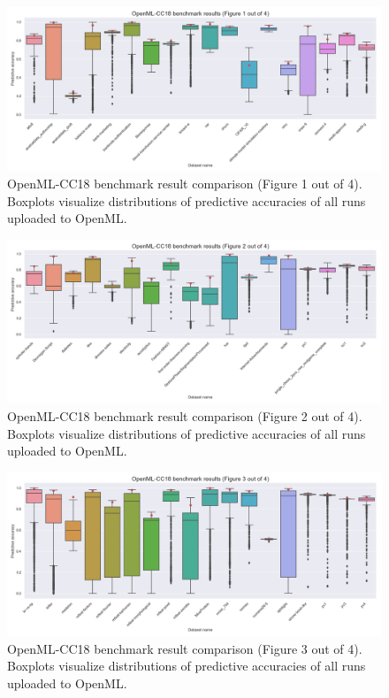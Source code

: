 \begin{figure}
    \includegraphics[width=\textwidth]{../img/openml-boxplot0.png}
    \caption{OpenML-CC18 benchmark result comparison (Figure 1 out of 4).
    Boxplots visualize distributions of predictive accuracies of all
    runs uploaded to OpenML.}
    \label{fig:OpenML:boxplot:0}
\end{figure}

\begin{figure}
    \includegraphics[width=\textwidth]{../img/openml-boxplot1.png}
    \caption{OpenML-CC18 benchmark result comparison (Figure 2 out of 4).
    Boxplots visualize distributions of predictive accuracies of all
    runs uploaded to OpenML.}
    \label{fig:OpenML:boxplot:1}
\end{figure}

\begin{figure}
    \includegraphics[width=\textwidth]{../img/openml-boxplot2.png}
    \caption{OpenML-CC18 benchmark result comparison (Figure 3 out of 4).
    Boxplots visualize distributions of predictive accuracies of all
    runs uploaded to OpenML.}
    \label{fig:OpenML:boxplot:2}
\end{figure}

